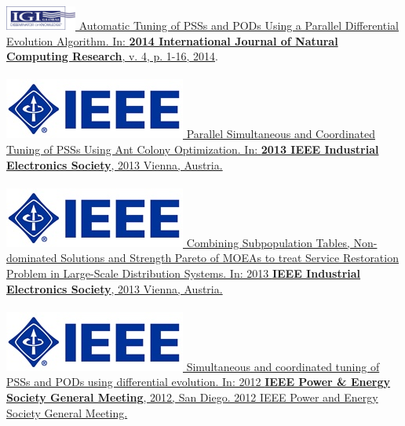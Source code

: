 \documentclass[]{friggeri-cv}
\begin{document}
\href{http://dx.doi.org/10.4018/ijncr.2014010101}{\includegraphics[height=\fontcharht\font`\B]{img/igi_global_.png} Automatic Tuning of PSSs and PODs Using a Parallel Differential Evolution Algorithm. In: \textbf{2014 International Journal of Natural Computing Research}, v. 4, p. 1-16, 2014}.\\
\\
\href{http://dx.doi.org/10.1109/IECON.2013.6699462}{\includegraphics[scale=0.11]{img/ieee.jpg} Parallel Simultaneous and Coordinated Tuning of PSSs Using Ant Colony Optimization. In: \textbf{2013 IEEE Industrial Electronics Society}, 2013 Vienna, Austria.}\\
\\
\href{http://dx.doi.org/10.1109/IECON.2013.6699436}{\includegraphics[scale=0.11]{img/ieee.jpg} Combining Subpopulation Tables, Non-dominated Solutions and Strength Pareto of MOEAs to treat Service Restoration Problem in Large-Scale Distribution Systems. In: 2013 \textbf{IEEE Industrial Electronics Society}, 2013 Vienna, Austria.}\\
\\
\href{http://dx.doi.org/10.1109/PESGM.2012.6345340}{\includegraphics[scale=0.11]{img/ieee.jpg} Simultaneous and coordinated tuning of PSSs and PODs using differential evolution. In: 2012 \textbf{IEEE Power \& Energy Society General Meeting}, 2012, San Diego. 2012 IEEE Power and Energy Society General Meeting.}%
\end{document}
